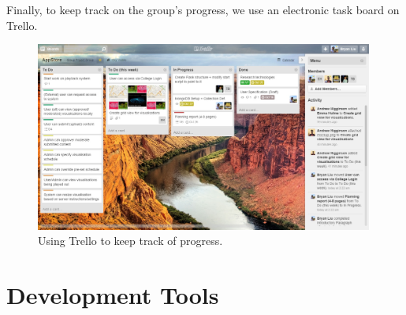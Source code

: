 \documentclass[a4paper]{article}
\begin{document}

Finally, to keep track on the group's progress, we use an electronic task
board on Trello. %



\begin{figure}[ht]
  \centering
    \includegraphics[width = 0.99\textwidth]{./planning/trello.jpg}
   
  \caption{Using Trello to keep track of progress.}
  \label{fig:trello}
\end{figure}

\section{Development Tools}
\end{document}
